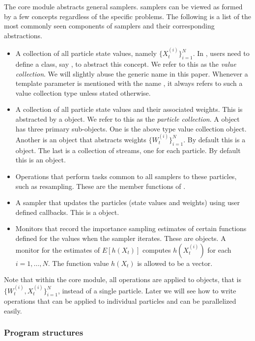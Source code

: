 The core module abstracts general \smc samplers. \smc samplers can be viewed
as formed by a few concepts regardless of the specific problems. The following
is a list of the most commonly seen components of \smc samplers and their
corresponding \vsmc abstractions.
\begin{itemize}
  \item A collection of all particle state values, namely
    $\{X_t^{(i)}\}_{i=1}^N$. In \vsmc, users need to define a class, say
    , to abstract this concept. We refer to this as the \emph{value
      collection}. We will slightly abuse the generic name  in this
    paper. Whenever a template parameter is mentioned with the name ,
    it always refers to such a value collection type unless stated otherwise.
  \item A collection of all particle state values and their associated
    weights. This is abstracted by a  object. We refer to
    this as the \emph{particle collection}. A  object has
    three primary sub-objects. One is the above type  value collection
    object. Another is an object that abstracts weights
    $\{W_t^{(i)}\}_{i=1}^N$. By default this is a  object. The
    last is a collection of \rng streams, one for each particle. By default
    this is an  object.
  \item Operations that perform tasks common to all samplers to these
    particles, such as resampling. These are the member functions of
    .
  \item A sampler that updates the particles (state values and weights) using
    user defined callbacks. This is a  object.
  \item Monitors that record the importance sampling estimates of certain
    functions defined for the values when the sampler iterates. These are
     objects. A monitor for the estimates of $E[h(X_t)]$
    computes $h(X_t^{(i)})$ for each $i = 1,\dots,N$. The function value
    $h(X_t)$ is allowed to be a vector.
\end{itemize}
Note that within the core module, all operations are applied to
 objects, that is $\{W_t^{(i)},X_t^{(i)}\}_{i=1}^N$, instead
of a single particle. Later we will see how to write operations that can be
applied to individual particles and can be parallelized easily.

\subsubsection{Program structures}

